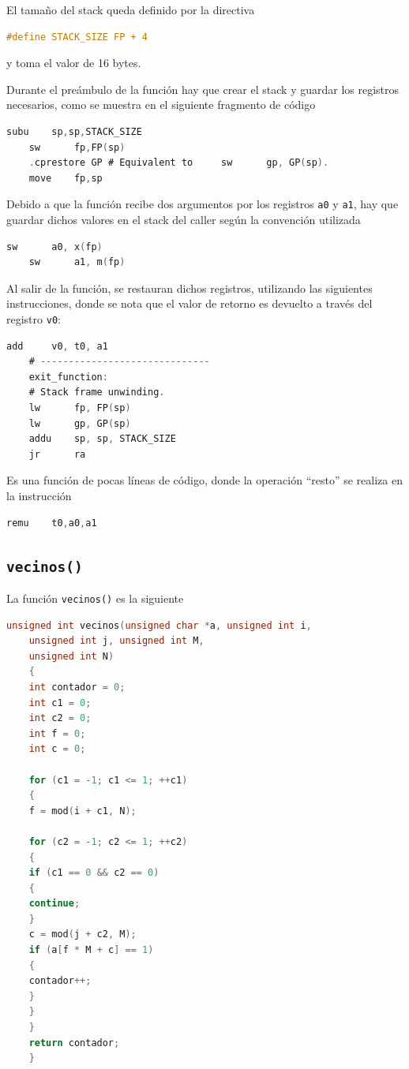 \documentclass[a4paper,12pt]{article}
\newcommand{\quotes}[1]{``#1''}
\numberwithin{equation}{section}
\numberwithin{figure}{section}
\begin{document}
	El tamaño del stack queda definido por la directiva
	\begin{lstlisting}[language=C, style=StyleC]
	#define STACK_SIZE FP + 4
	\end{lstlisting}
	y toma el valor de \SI{16}{} bytes.
	
	Durante el preámbulo de la función hay que crear el stack y guardar los registros necesarios, como se muestra en el siguiente fragmento de código
	\begin{lstlisting}[language=C, style=StyleC]
	subu	sp,sp,STACK_SIZE
	sw	    fp,FP(sp)
	.cprestore GP # Equivalent to     sw      gp, GP(sp).
	move    fp,sp
	\end{lstlisting}
	
	Debido a que la función recibe dos argumentos por los registros \texttt{a0} y \texttt{a1}, hay que guardar dichos valores en el stack del caller según la convención utilizada
	\begin{lstlisting}[language=C, style=StyleC]
	sw      a0, x(fp)
	sw      a1, m(fp)
	\end{lstlisting}
	
	Al salir de la función, se restauran dichos registros, utilizando las siguientes instrucciones, donde se nota que el valor de retorno es devuelto a través del registro \texttt{v0}:
	\begin{lstlisting}[language=C, style=StyleC]
	add		v0, t0, a1
	# ------------------------------
	exit_function:
	# Stack frame unwinding.
	lw      fp, FP(sp)
	lw      gp, GP(sp)
	addu    sp, sp, STACK_SIZE
	jr      ra
	\end{lstlisting}
	
	Es una función de pocas líneas de código, donde la operación \quotes{resto} se realiza en la instrucción
	\begin{lstlisting}[language=C, style=StyleC]
	remu    t0,a0,a1
	\end{lstlisting}
	
	\subsection{\texttt{vecinos()}}
	
	La función \texttt{vecinos()} es la siguiente
	\begin{lstlisting}[language=C, style=StyleC]
	unsigned int vecinos(unsigned char *a, unsigned int i,
	unsigned int j, unsigned int M,
	unsigned int N)
	{
	int contador = 0;
	int c1 = 0;
	int c2 = 0;
	int f = 0;
	int c = 0;
	
	for (c1 = -1; c1 <= 1; ++c1)
	{
	f = mod(i + c1, N);
	
	for (c2 = -1; c2 <= 1; ++c2)
	{
	if (c1 == 0 && c2 == 0)
	{
	continue;
	}
	c = mod(j + c2, M);
	if (a[f * M + c] == 1)
	{
	contador++;
	}
	}
	}
	return contador;
	}
	\end{lstlisting}
	
\end{document}
